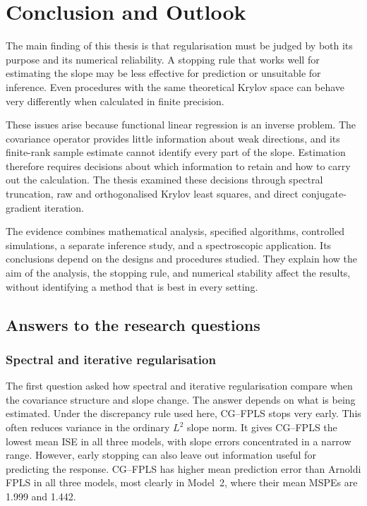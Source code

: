 \chapter{Conclusion and Outlook}
\label{chap:conclusion}

The main finding of this thesis is that regularisation must be judged by
both its purpose and its numerical reliability.  A stopping rule that works
well for estimating the slope may be less effective for prediction or
unsuitable for inference.  Even procedures with the same theoretical
Krylov space can behave very differently when calculated in finite precision.

These issues arise because functional linear regression is an inverse
problem.  The covariance operator provides little information about weak
directions, and its finite-rank sample estimate cannot identify every part
of the slope.  Estimation therefore requires decisions about which
information to retain and how to carry out the calculation.  The thesis
examined these decisions through spectral truncation, raw and orthogonalised
Krylov least squares, and direct conjugate-gradient iteration.

The evidence combines mathematical analysis, specified algorithms,
controlled simulations, a separate inference study, and a spectroscopic
application.  Its conclusions depend on the designs and procedures studied.
They explain how the aim of the analysis, the stopping rule, and numerical
stability affect the results, without identifying a method that is best in
every setting.

\section{Answers to the research questions}
\label{sec:conclusion-research-questions}

\subsection{Spectral and iterative regularisation}

The first question asked how spectral and iterative regularisation compare
when the covariance structure and slope change.  The answer depends on
what is being estimated.  Under the discrepancy rule used here, CG--FPLS
stops very early.  This often reduces variance in the
ordinary $L^2$ slope norm.  It gives CG--FPLS the lowest mean ISE in all
three models, with slope errors concentrated in a narrow range.
However, early stopping can also leave out information useful for predicting
the response.  CG--FPLS has higher mean prediction error than Arnoldi FPLS
in all three models, most clearly in Model~2, where their mean MSPEs are
1.999 and 1.442.

